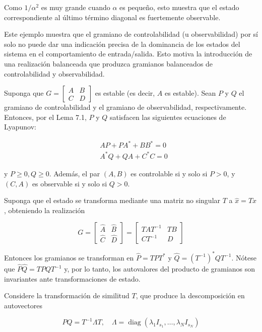 Como $1 / \alpha^{2}$ es muy grande cuando $\alpha$ es pequeño, esto muestra que el estado correspondiente al último término diagonal es fuertemente observable.

Este ejemplo muestra que el gramiano de controlabilidad (u observabilidad) por sí solo no puede dar una indicación precisa de la dominancia de los estados del sistema en el comportamiento de entrada/salida. Esto motiva la introducción de una realización balanceada que produzca gramianos balanceados de controlabilidad y observabilidad.

Suponga que $G=\left[\begin{array}{c|c}A & B \\ \hline C & D\end{array}\right]$ es estable (es decir, $A$ es estable). Sean $P$ y $Q$ el gramiano de controlabilidad y el gramiano de observabilidad, respectivamente. Entonces, por el Lema 7.1, $P$ y $Q$ satisfacen las siguientes ecuaciones de Lyapunov:


\begin{align*}
& A P+P A^{*}+B B^{*}=0  \tag{7.2}\\
& A^{*} Q+Q A+C^{*} C=0 \tag{7.3}
\end{align*}


y $P \geq 0, Q \geq 0$. Además, el par $(A, B)$ es controlable si y solo si $P>0$, y $(C, A)$ es observable si y solo si $Q>0$.

Suponga que el estado se transforma mediante una matriz no singular $T$ a $\hat{x}=T x$, obteniendo la realización

$$
G=\left[\begin{array}{c|c}
\hat{A} & \hat{B} \\
\hline \hat{C} & \hat{D}
\end{array}\right]=\left[\begin{array}{c|c}
T A T^{-1} & T B \\
\hline C T^{-1} & D
\end{array}\right]
$$

Entonces los gramianos se transforman en $\hat{P}=T P T^{*}$ y $\hat{Q}=\left(T^{-1}\right)^{*} Q T^{-1}$. Nótese que $\hat{P} \hat{Q}=T P Q T^{-1}$ y, por lo tanto, los autovalores del producto de gramianos son invariantes ante transformaciones de estado.

Considere la transformación de similitud $T$, que produce la descomposición en autovectores

$$
P Q=T^{-1} \Lambda T, \quad \Lambda=\operatorname{diag}\left(\lambda_{1} I_{s_{1}}, \ldots, \lambda_{N} I_{s_{N}}\right)
$$

